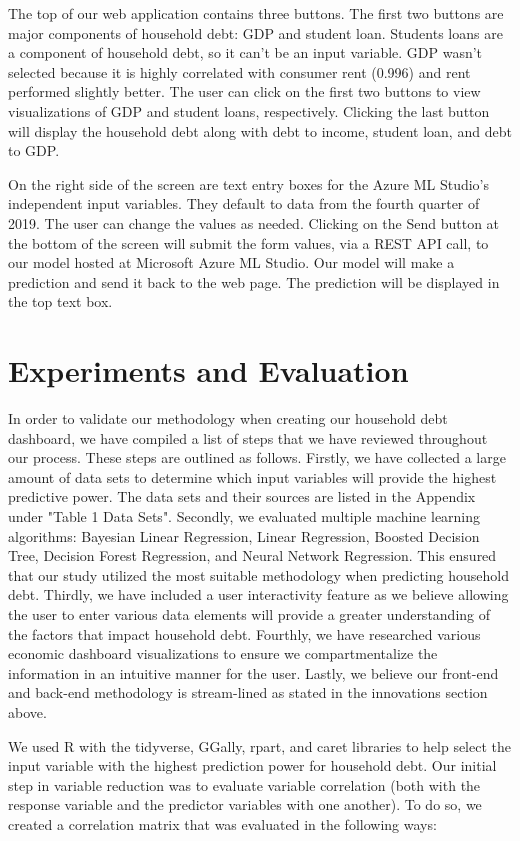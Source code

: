 \documentclass[sigconf,nonacm,11pt]{acmart}
\begin{document}
The top of our web application contains three buttons. The first two buttons are major components of household debt: GDP and student loan. Students loans are a component of household debt, so it can't be an input variable. GDP wasn't selected because it is highly correlated with consumer rent (0.996) and rent performed slightly better.  The user can click on the first two buttons to view visualizations of GDP and student loans, respectively. Clicking the last button will display the household debt along with debt to income, student loan, and debt to GDP.  

On the right side of the screen are text entry boxes for the Azure ML Studio's independent input variables. They default to data from the fourth quarter of 2019. The user can change the values as needed. Clicking on the Send button at the bottom of the screen will submit the form values, via a REST API call, to our model hosted at Microsoft Azure ML Studio. Our model will make a prediction and send it back to the web page.  The prediction will be displayed in the top text box.

\section{Experiments and Evaluation}
In order to validate our methodology when creating our household debt dashboard, we have compiled a list of steps that we have reviewed throughout our process. These steps are outlined as follows. Firstly, we have collected a large amount of data sets to determine which input variables will provide the highest predictive power. The data sets and their sources are listed in the Appendix under "Table 1 Data Sets". Secondly, we evaluated multiple machine learning algorithms: Bayesian Linear Regression, Linear Regression, Boosted Decision Tree, Decision Forest Regression, and Neural Network Regression. This ensured that our study utilized the most suitable methodology when predicting household debt. Thirdly, we have included a user interactivity feature as we believe allowing the user to enter various data elements will provide a greater understanding of the factors that impact household debt. Fourthly, we have researched various economic dashboard visualizations to ensure we compartmentalize the information in an intuitive manner for the user. Lastly, we believe our front-end and back-end methodology is stream-lined as stated in the innovations section above. 


We used R with the tidyverse, GGally, rpart, and caret libraries to help select the input variable with the highest prediction power for household debt. Our initial step in variable reduction was to evaluate variable correlation (both with the response variable and the predictor variables with one another).  To do so, we created a correlation matrix that was evaluated in the following ways:
\end{document}
